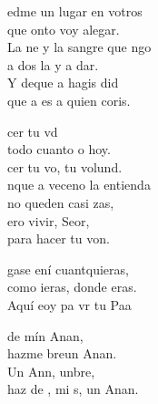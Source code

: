 \documentclass[12pt]{article}
\begin{document}
\begin{multicols*}{2}
\begin{cancion}%
	edme un lugar en votros\\
	que onto voy alegar.\\
	La ne y la sangre que ngo \\
	a dos la y a dar.\\
	Y deque a hagis did \\
	que a  es a quien coris. \\
\end{cancion}%

\begin{cancion}%
	cer tu vd \\
	 todo cuanto o hoy.\\
	cer tu vo, tu volund.\\
\jump
	nque a veceno la entienda\\
	no queden casi zas,\\
	ero vivir, Seor,\\
	para hacer tu von.\\
\end{cancion}%

\begin{cancion}[Hágase][Ixcís]%
	gase ení cuantquieras, \\
	como ieras, donde eras.\\
	Aquí eoy pa vr tu Paa\\
\end{cancion}%

\begin{cancion}%
	 de mín Anan, \\
	hazme breun Anan.\\
	Un Ann, unbre,\\
	haz de , mi s, un Anan. \\
\end{cancion}%


\end{multicols*}
\end{document}
